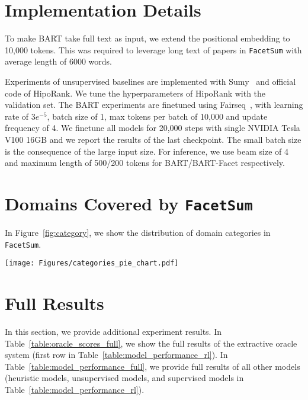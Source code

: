 \documentclass[11pt,a4paper]{article}
\newcommand{\ours}{\texttt{FacetSum}\xspace}
\newcommand{\bart}{BART\xspace}
\newcommand{\bartf}{BART-Facet\xspace}
\begin{document}
\section{Implementation Details}
\label{ref:bart_implementation}
To make BART take full text as input, we extend the positional embedding to 10,000 tokens. This was required to leverage long text of papers in \ours with average length of 6000 words. 

Experiments of unsupervised baselines are implemented with Sumy~\cite{sumy} and official code of HipoRank. We tune the hyperparameters of HipoRank with the validation set. The BART experiments are finetuned using Fairseq~\cite{ott2019fairseq}, with learning rate of $3e^{-5}$, batch size of 1, max tokens per batch of 10,000 and update frequency of 4. We finetune all models for  20,000 steps with single NVIDIA Tesla V100 16GB and we report the results of the last checkpoint. The small batch size is the consequence of the large input size. For inference, we use beam size of 4 and maximum length of 500/200 tokens for \bart/\bartf respectively. 



\section{Domains Covered by \ours}
\label{appendix:domain}
In Figure~\ref{fig:category}, we show the distribution of domain categories in \ours.

\begin{figure*}[ht!]
    \centering
\texttt{[image: Figures/categories\_pie\_chart.pdf]}
    \caption{Data distribution of domain categories, sorted in descending order.}
    \label{fig:category}
\end{figure*}




\section{Full Results}
\label{appendix:full_results}
In this section, we provide additional experiment results.
In Table~\ref{table:oracle_scores_full}, we show the full results of the extractive oracle system (first row in Table~\ref{table:model_performance_rl}).
In Table~\ref{table:model_performance_full}, we provide full results of all other models (heuristic models, unsupervised models, and supervised models in Table~\ref{table:model_performance_rl}).
\end{document}
